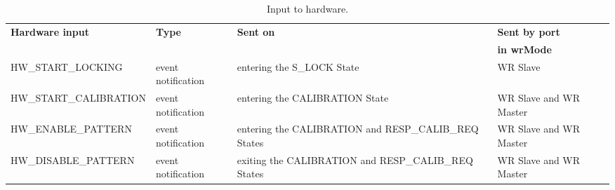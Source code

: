 \documentclass[a4paper, 12pt]{article}
\begin{document}
\newpage

\begin{table}[ht!]
\caption{Input to hardware.}
\centering
\begin{tabular}{| p{5.1cm} | p{2cm} | p{5.5cm} | p{2.6cm} |}          \hline

\textbf{Hardware input}       & \textbf{Type }     & \textbf{Sent on }         & \textbf{Sent by port}  \\ 
                     &                    &         	 	      & \textbf{in wrMode} \\ \hline
\small
HW\_START\_LOCKING   & event notification & entering the 
					    S\_LOCK State          & WR Slave           \\ \hline
HW\_START\_CALIBRATION\footnotemark[7]
		      & event notification & entering the CALIBRATION  
					    State		       & WR Slave and WR Master \\ \hline
HW\_ENABLE\_PATTERN  & event notification & entering the CALIBRATION and 
					    RESP\_CALIB\_REQ States & WR Slave and WR Master \\ \hline
HW\_DISABLE\_PATTERN & event notification & exiting the CALIBRATION and 
					    RESP\_CALIB\_REQ States & WR Slave and WR Master           \\ \hline
\end{tabular}
\label{tab:inputWrCommWithHW}
\end{table}

\addtocounter{footnote}{1}
\end{document}
